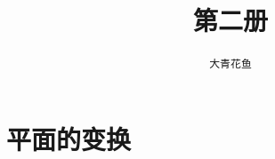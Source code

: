 \documentclass[12pt,UTF8]{ctexbook}
\title{\zihao{0} \bfseries 第二册}
\author{\zihao{2} \texttt{大青花鱼}}
\date{}
\newtheorem{ex}{例子}[section]
\begin{document}
\maketitle
\tableofcontents
\newpage

\chapter{平面的变换}








\end{document}
